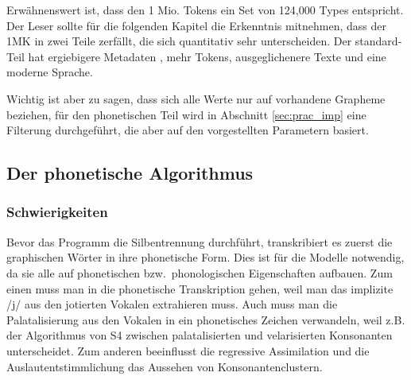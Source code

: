\documentclass[12pt,headsepline,a4paper]{scrartcl}
\begin{document}
Erwähnenswert ist, dass den 1 Mio. Tokens ein Set von 124,000 Types entspricht. Der Leser sollte für die folgenden Kapitel die Erkenntnis mitnehmen, dass der 1MK in zwei Teile zerfällt, die sich quantitativ sehr unterscheiden. Der standard-Teil hat ergiebigere Metadaten , mehr Tokens, ausgeglichenere Texte und eine moderne Sprache.

% 

Wichtig ist aber zu sagen, dass sich alle Werte nur auf vorhandene Grapheme beziehen, für den phonetischen Teil wird in Abschnitt \ref{sec:prac_imp} eine Filterung durchgeführt, die aber auf den vorgestellten Parametern basiert.

\subsection{Der phonetische Algorithmus}
\label{sec:phon_alg}

\subsubsection{Schwierigkeiten}
Bevor das Programm die Silbentrennung durchführt, transkribiert es zuerst die graphischen Wörter in ihre phonetische Form. Dies ist für die Modelle notwendig, da sie alle auf phonetischen bzw.\ phonologischen Eigenschaften aufbauen. Zum einen muss man in die phonetische Transkription gehen, weil man das implizite /j/ aus den jotierten Vokalen extrahieren muss. Auch muss man die Palatalisierung aus den Vokalen in ein phonetisches Zeichen verwandeln, weil z.B. der Algorithmus von S4 zwischen palatalisierten und velarisierten Konsonanten unterscheidet. Zum anderen beeinflusst die regressive Assimilation und die Auslautentstimmlichung das Aussehen von Konsonantenclustern.
\end{document}
